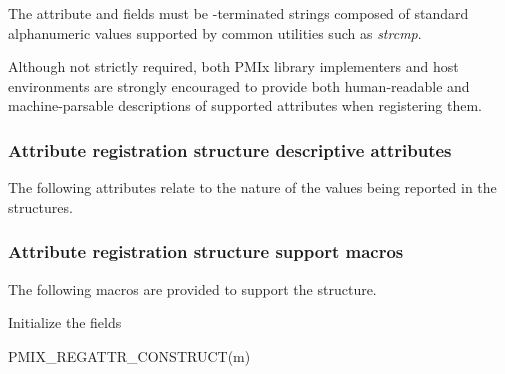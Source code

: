 The attribute  and  fields must be -terminated strings composed of standard alphanumeric values supported by common utilities such as \textit{strcmp}.

Although not strictly required, both \ac{PMIx} library implementers and host environments are strongly encouraged to provide both human-readable and machine-parsable descriptions of supported attributes when registering them.


\subsubsection{Attribute registration structure descriptive attributes}
\label{api:struct:attributes:descr}

The following attributes relate to the nature of the values being reported
in the  structures.




\subsubsection{Attribute registration structure support macros}
The following macros are provided to support the  structure.


Initialize the  fields

\cspecificstart
\begin{codepar}
PMIX_REGATTR_CONSTRUCT(m)
\end{codepar}
\cspecificend

